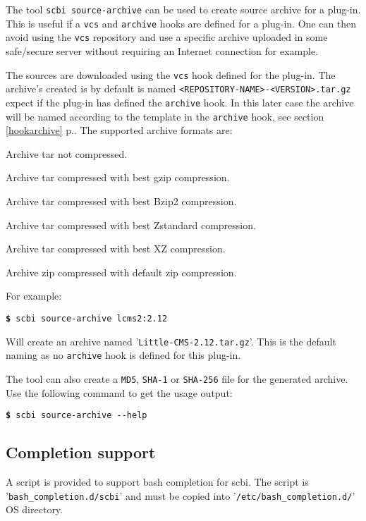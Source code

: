 \documentclass[a4paper,12pt,twoside]{article}
\newcommand{\code}[1]{\texttt{#1}}
\newcommand{\seeref}[1]{see section \ref{#1} p.\pageref{#1}}
\newcommand{\file}[1]{'{\texttt{#1}}'}
\newcommand{\cmd}[1]{\tabto{1cm}\hspace{0.5cm}\texttt{\textbf{\$} #1}}
\newcommand{\ddash}{-{}-}
\begin{document}
The tool \code{scbi source-archive} can be used to create source archive for a plug-in. This is useful if a \code{vcs} and \code{archive} hooks are defined for a plug-in. One can then avoid using the \code{vcs} repository and use a specific archive uploaded in some safe/secure server without requiring an Internet connection for example.

The sources are downloaded using the \code{vcs} hook defined for the plug-in. The archive's created is by default is named \code{<REPOSITORY-NAME>-<VERSION>.tar.gz} expect if the plug-in has defined the \code{archive} hook. In this later case the archive will be named according to the template in the \code{archive} hook, \seeref{hookarchive}. The supported archive formats are:

\begin{description}[style=nextline]
	\item[.tar] Archive tar not compressed.
	\item[.tar.gz] Archive tar compressed with best gzip compression.
	\item[.tar.bz2] Archive tar compressed with best Bzip2 compression.
	\item[.tar.zst] Archive tar compressed with best Zstandard compression.
	\item[.tar.xz] Archive tar compressed with best XZ compression.
	\item[.zip] Archive zip compressed with default zip compression.
\end{description}

For example:

\cmd{scbi source-archive lcms2:2.12}

Will create an archive named \file{Little-CMS-2.12.tar.gz}. This is the default naming as no \code{archive} hook is defined for this plug-in.

The tool can also create a \code{MD5}, \code{SHA-1} or \code{SHA-256}
file for the generated archive. Use the following command to get the usage output:

\cmd{scbi source-archive \ddash{}help}

\subsection{Completion support}
\label{completion}

A script is provided to support bash completion for scbi. The script is \file{bash\_completion.d/scbi} and must be copied into \file{/etc/bash\_completion.d/} OS directory.
\end{document}
